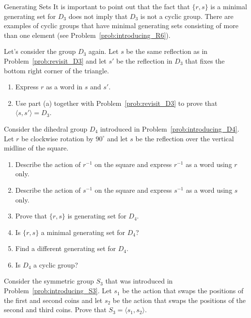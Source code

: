 \begin{section}{Generating Sets}
It is important to point out that the fact that $\{r,s\}$ is a minimal generating set for $D_3$ does not imply that $D_3$ is not a cyclic group. There are examples of cyclic groups that have minimal generating sets consisting of more than one element (see Problem~\ref{prob:introducing_R6}).

\begin{problem}\label{prob:alternate_D3}
Let's consider the group $D_3$ again. Let $s$ be the same reflection as in Problem~\ref{prob:revisit_D3} and let $s'$ be the reflection in $D_3$ that fixes the bottom right corner of the triangle.
\begin{enumerate}[label=\rm{(\alph*)}]
\item Express $r$ as a word in $s$ and $s'$.
\item Use part (a) together with Problem~\ref{prob:revisit_D3} to prove that $\langle s,s'\rangle=D_3$.
\end{enumerate}
\end{problem}

\begin{problem}\label{prob:revisiting_D4}
Consider the dihedral group $D_4$ introduced in Problem~\ref{prob:introducing_D4}. Let $r$ be clockwise rotation by $90^\circ$ and let $s$ be the reflection over the vertical midline of the square.
\begin{enumerate}[label=\rm{(\alph*)}]
\item Describe the action of $r^{-1}$ on the square and express $r^{-1}$ as a word using $r$ only.
\item Describe the action of $s^{-1}$ on the square and express $s^{-1}$ as a word using $s$ only.
\item Prove that $\{r,s\}$ is generating set for $D_4$.
\item Is $\{r,s\}$ a minimal generating set for $D_4$?
\item Find a different generating set for $D_4$.
\item Is $D_4$ a cyclic group?
\end{enumerate} 
\end{problem}

\begin{problem}\label{prob:revisiting_S3}
Consider the symmetric group $S_3$ that was introduced in Problem~\ref{prob:introducing_S3}. Let $s_1$ be the action that swaps the positions of the first and second coins and let $s_2$ be the action that swaps the positions of the second and third coins. Prove that $S_3=\langle s_1, s_2\rangle$.
\end{problem}


\end{section}
